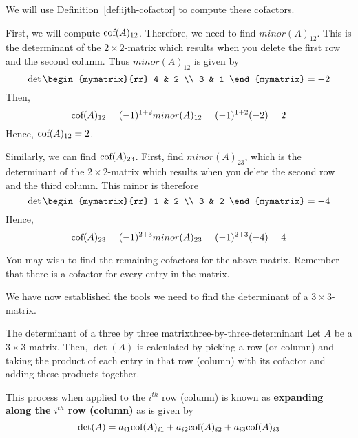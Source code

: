 \begin{solution} We will use Definition~\ref{def:ijth-cofactor} to compute these cofactors. 

First, we will compute $\mbox{\rm cof}(A) _{12}$. 
Therefore, we need to find $minor(A)_{12}$. This is the determinant of the $2\times 2$-matrix
which results when you delete the first row and the second column. Thus $minor(A)_{12}$ is given by 
\begin{equation*}
\det \begin{mymatrix}{rr}
4 & 2 \\
3 & 1
\end{mymatrix} = -2
\end{equation*}
Then,
\begin{equation*}
\mbox{\rm cof}(A) _{12}=(-1) ^{1+2} minor(A)_{12} =(-1) ^{1+2}(-2) =2
\end{equation*}
Hence, $\mbox{\rm cof}(A) _{12}=2$.

Similarly, we can find $\mbox{\rm cof}(A) _{23}$. First, find $minor(A)_{23}$, which is the determinant of the $2\times 2$-matrix
which results when you delete the second row and the third column. This
minor is therefore
\begin{equation*}
\det \begin{mymatrix}{rr}
1 & 2 \\
3 & 2
\end{mymatrix} = -4
\end{equation*}
Hence,
\begin{equation*}
\mbox{\rm cof}(A) _{23}=(-1) ^{2+3} minor(A)_{23} =(-1) ^{2+3}(-4) =4
\end{equation*}
\end{solution}

You may wish to find the remaining cofactors for the above matrix. Remember that there is a cofactor 
for every entry in the matrix.  

We have now established the tools we need to find the determinant of a $3 \times3 $-matrix.

\begin{definition}{The determinant of a three by three matrix}{three-by-three-determinant}
Let $A$ be a $3\times 3$-matrix. Then, $\det (A)$ is calculated by picking a row
(or column) and taking the product of each entry in that row (column) with its
cofactor and adding these products together. 

This process when applied to the $i^{th}$
row (column) is known as \textbf{expanding along the $i^{th}$ row
(column)} as is given by 
\[
\det (A) = a_{i1}\mbox{\rm cof}(A)_{i1} + a_{i2}\mbox{\rm cof}(A)_{i2} + a_{i3}\mbox{\rm cof}(A)_{i3}
\]

\end{definition}

